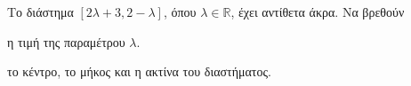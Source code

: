 Το διάστημα $ [2\lambda+3,2-\lambda] $, όπου $ \lambda\in\mathbb{R} $, έχει αντίθετα άκρα. Να βρεθούν 
\begin{alist}
\item η τιμή της παραμέτρου $ \lambda $.
\item το κέντρο, το μήκος και η ακτίνα του διαστήματος.
\end{alist}
